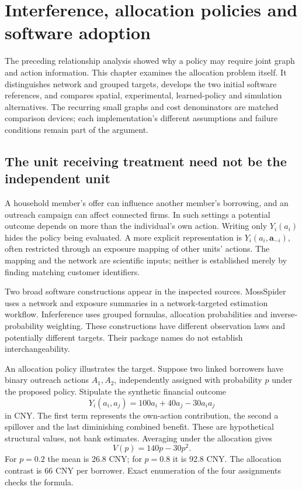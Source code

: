\chapter{Interference, allocation policies and software adoption}
\label{v13:sw-networks}

The preceding relationship analysis showed why a policy may require joint
graph and action information. This chapter examines the allocation problem
itself. It distinguishes network and grouped targets, develops the two initial
software references, and compares spatial, experimental, learned-policy and
simulation alternatives. The recurring small graphs and cost denominators are
matched comparison devices; each implementation's different assumptions and
failure conditions remain part of the argument.

\section{The unit receiving treatment need not be the independent unit}

A household member's offer can influence another member's borrowing, and an
outreach campaign can affect connected firms. In such settings a potential
outcome depends on more than the individual's own action. Writing only
$Y_i(a_i)$ hides the policy being evaluated. A more explicit representation is
$Y_i(a_i,\mathbf a_{-i})$, often restricted through an exposure mapping of
other units' actions. The mapping and the network are scientific inputs;
neither is established merely by finding matching customer identifiers.

Two broad software constructions appear in the inspected sources. MossSpider
uses a network and exposure summaries in a network-targeted estimation
workflow. Inferference uses grouped formulas, allocation probabilities and
inverse-probability weighting. These constructions have different observation
laws and potentially different targets. Their package names do not establish
interchangeability. \cite{v13_sw_mossspider,v13_sw_inferference}

An allocation policy illustrates the target. Suppose two linked borrowers have
binary outreach actions $A_1,A_2$, independently assigned with probability $p$
under the proposed policy. Stipulate the synthetic financial outcome
\[
 Y_i(a_i,a_j)=100a_i+40a_j-30a_i a_j
\]
in CNY. The first term represents the own-action contribution, the second a
spillover and the last diminishing combined benefit. These are hypothetical
structural values, not bank estimates. Averaging under the allocation gives
\[
 V(p)=140p-30p^2.
\]
For $p=0.2$ the mean is 26.8 CNY; for $p=0.8$ it is 92.8 CNY. The allocation
contrast is 66 CNY per borrower. Exact enumeration of the four assignments
checks the formula. \cite{v13_project_exact}


